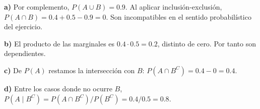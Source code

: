 \textbf{a)} Por complemento, $P(A\cup B)=0.9$.
Al aplicar inclusión-exclusión,
$P(A\cap B)=0.4+0.5-0.9=0$. Son incompatibles en el sentido
probabilístico del ejercicio.

\textbf{b)} El producto de las marginales es $0.4\cdot0.5=0.2$,
distinto de cero. Por tanto son dependientes.

\textbf{c)} De $P(A)$ restamos la intersección con $B$:
$P(A\cap B^C)=0.4-0=\boxed{0.4}$.

\textbf{d)} Entre los casos donde no ocurre $B$,
$P(A\mid B^C)=P(A\cap B^C)/P(B^C)=0.4/0.5=\boxed{0.8}$.
